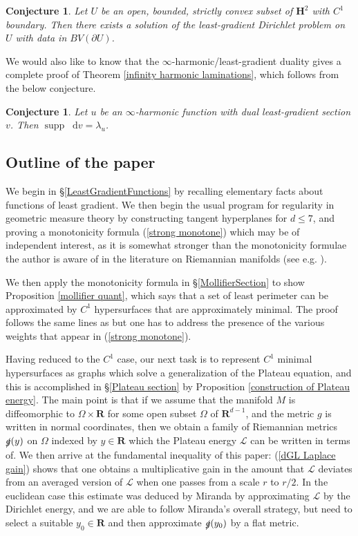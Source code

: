 \documentclass[reqno,12pt,letterpaper]{amsart}
\newcommand{\RR}{\mathbf{R}}
\newcommand{\Hyp}{\mathbf H}
\DeclareMathOperator{\supp}{supp}
\newcommand*\dif{\mathop{}\!\mathrm{d}}
\newcommand{\Lagrange}{\mathscr L}
\newtheorem{conjecture}[theorem]{Conjecture}
\theoremstyle{definition}
\numberwithin{equation}{section}
\begin{document}
\begin{conjecture}
Let $U$ be an open, bounded, strictly convex subset of $\Hyp^2$ with $C^1$ boundary.
Then there exists a solution of the least-gradient Dirichlet problem on $U$ with data in $BV(\partial U)$.
\end{conjecture}

We would also like to know that the $\infty$-harmonic/least-gradient duality gives a complete proof of Theorem \ref{infinity harmonic laminations}, which follows from the below conjecture.

\begin{conjecture}\label{two laminations agree}
Let $u$ be an $\infty$-harmonic function with dual least-gradient section $v$.
Then $\supp \dif v = \lambda_u$.
\end{conjecture}


\subsection{Outline of the paper}
We begin in \S\ref{LeastGradientFunctions} by recalling elementary facts about functions of least gradient.
We then begin the usual program for regularity in geometric measure theory by constructing tangent hyperplanes for $d \leq 7$, and proving a monotonicity formula (\ref{strong monotone}) which may be of independent interest, as it is somewhat stronger than the monotonicity formulae the author is aware of in the literature on Riemannian manifolds (see e.g. \cite[\S7]{MarquesXX}).

We then apply the monotonicity formula in \S\ref{MollifierSection} to show Proposition \ref{mollifier quant}, which says that a set of least perimeter can be approximated by $C^1$ hypersurfaces that are approximately minimal. The proof follows the same lines as \cite[Chapter 7]{Giusti77} but one has to address the presence of the various weights that appear in (\ref{strong monotone}).

Having reduced to the $C^1$ case, our next task is to represent $C^1$ minimal hypersurfaces as graphs which solve a generalization of the Plateau equation, and this is accomplished in \S\ref{Plateau section} by Proposition \ref{construction of Plateau energy}.
The main point is that if we assume that the manifold $M$ is diffeomorphic to $\Omega \times \RR$ for some open subset $\Omega$ of $\RR^{d - 1}$, and the metric $g$ is written in normal coordinates, then we obtain a family of Riemannian metrics $\slashed g(y)$ on $\Omega$ indexed by $y \in \RR$ which the Plateau energy $\Lagrange$ can be written in terms of.
We then arrive at the fundamental inequality of this paper: (\ref{dGL Laplace gain}) shows that one obtains a multiplicative gain in the amount that $\Lagrange$ deviates from an averaged version of $\Lagrange$ when one passes from a scale $r$ to $r/2$.
In the euclidean case this estimate was deduced by Miranda \cite[Teorema 4.3]{Miranda66} by approximating $\Lagrange$ by the Dirichlet energy, and we are able to follow Miranda's overall strategy, but need to select a suitable $y_0 \in \RR$ and then approximate $\slashed g(y_0)$ by a flat metric.
\end{document}

